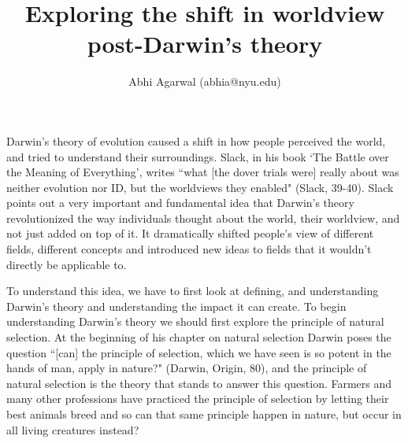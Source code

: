 \documentclass[11pt, oneside]{article}
\title{Exploring the shift in worldview post-Darwin's theory}
\author{Abhi Agarwal (abhia@nyu.edu)}
\date{}
\begin{document}
\maketitle



\par Darwin's theory of evolution caused a shift in how people perceived the world, and tried to understand their surroundings. Slack, in his book `The Battle over the Meaning of Everything', writes ``what [the dover trials were] really about was neither evolution nor ID, but the worldviews they enabled" (Slack, 39-40). Slack points out a very important and fundamental idea that Darwin's theory revolutionized the way individuals thought about the world, their worldview, and not just added on top of it. It dramatically shifted people's view of different fields, different concepts and introduced new ideas to fields that it wouldn't directly be applicable to.


\par To understand this idea, we have to first look at defining, and understanding Darwin's theory and understanding the impact it can create. To begin understanding Darwin's theory we should first explore the principle of natural selection. At the beginning of his chapter on natural selection Darwin poses the question ``[can] the principle of selection, which we have seen is so potent in the hands of man, apply in nature?" (Darwin, Origin, 80), and the principle of natural selection is the theory that stands to answer this question. Farmers and many other professions have practiced the principle of selection by letting their best animals breed and so can that same principle happen in nature, but occur in all living creatures instead?  
\end{document}
